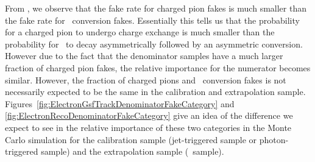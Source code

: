 \documentclass{cmspaper}
\begin{document}
\label{sec:systematics_chargecorrelation}
From , we observe that the fake rate for charged pion fakes is much smaller than the fake rate for \pizero\ conversion fakes. Essentially this tells us that the probability for a charged pion to undergo charge exchange is much smaller than the probability for \pizero\ to decay asymmetrically followed by an asymmetric conversion. However due to the fact that the denominator samples have a much larger fraction of charged pion fakes, the relative importance for the numerator becomes similar. However, the fraction of charged pions and \pizero\ conversion fakes is not necessarily expected to be the same in the calibration and extrapolation sample. Figures~\ref{fig:ElectronGsfTrackDenominatorFakeCategory} and \ref{fig:ElectronRecoDenominatorFakeCategory} give an idea of the difference we expect to see in the relative importance of these two categories in the Monte Carlo simulation for the calibration sample (jet-triggered sample or photon-triggered sample) and the extrapolation sample (\WPlusJets\ sample). 

\end{document}
